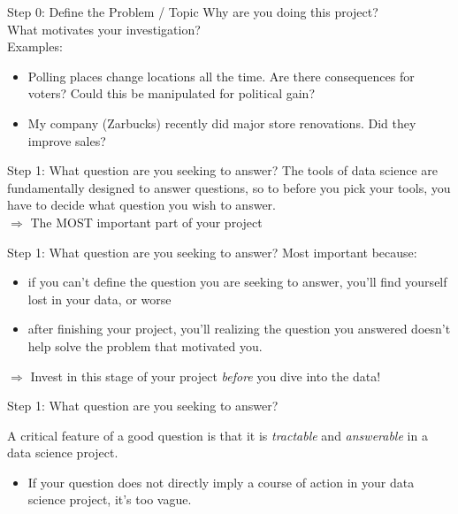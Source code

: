 \documentclass[11pt]{beamer}
\begin{document}
\begin{frame}[c]{Step 0: Define the \alert{Problem / Topic}}
Why are you doing this project? \\
\pause What \alert{motivates} your investigation?\\
\vspace*{0.1cm}
\pause Examples:
\begin{itemize}
  \item Polling places change locations all the time. Are there consequences for voters? Could this be manipulated for political gain?
  \item My company (Zarbucks) recently did major store renovations. Did they improve sales?
\end{itemize}
\end{frame}


\begin{frame}[c]{Step 1: What \alert{question} are you seeking to answer?}
The tools of data science are fundamentally designed to \alert{answer questions}, \pause so to before you pick your tools, you have to decide \alert{what question you wish to answer.}\\
\vspace*{0.1cm}
\pause $\Rightarrow$ The MOST important part of your project\\
\end{frame}

\begin{frame}[c]{Step 1: What \alert{question} are you seeking to answer?}
Most important because:

\begin{itemize}
  \pause \item if you can't define the question you are seeking to answer, \alert{you'll find yourself lost in your data}, or worse
  \pause \item after finishing your project, you'll realizing the question you answered doesn't help solve the problem that motivated you.
\end{itemize}
\pause  $\Rightarrow$ Invest in this stage of your project \emph{before} you dive into the data!
\end{frame}


\begin{frame}[c]{Step 1: What \alert{question} are you seeking to answer?}

A critical feature of a good question is that it is \emph{tractable} and \emph{answerable} in a data science project. \\
\begin{itemize}
  \item If your question does not directly imply a course of action in your data science project, it's too vague.
\end{itemize}
\end{frame}
\end{document}
